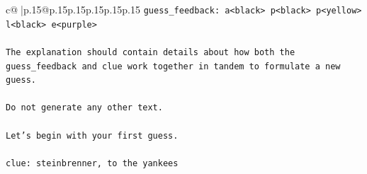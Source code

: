 \documentclass{article}
\begin{document}
{\begin{supertabular}{c@{$\;$}|p{.15\linewidth}@{}p{.15\linewidth}p{.15\linewidth}p{.15\linewidth}p{.15\linewidth}p{.15\linewidth}}
{{{\texttt{guess\_feedback: a<black> p<black> p<yellow> l<black> e<purple>} \\
\\ 
\texttt{The explanation should contain details about how both the guess\_feedback and clue work together in tandem to formulate a new guess.} \\
\\ 
\texttt{Do not generate any other text.} \\
\\ 
\texttt{Let's begin with your first guess.} \\
\\ 
\texttt{clue: steinbrenner, to the yankees} \\
            }
        }
    }
     \\ \\


\end{supertabular}}
\end{document}
